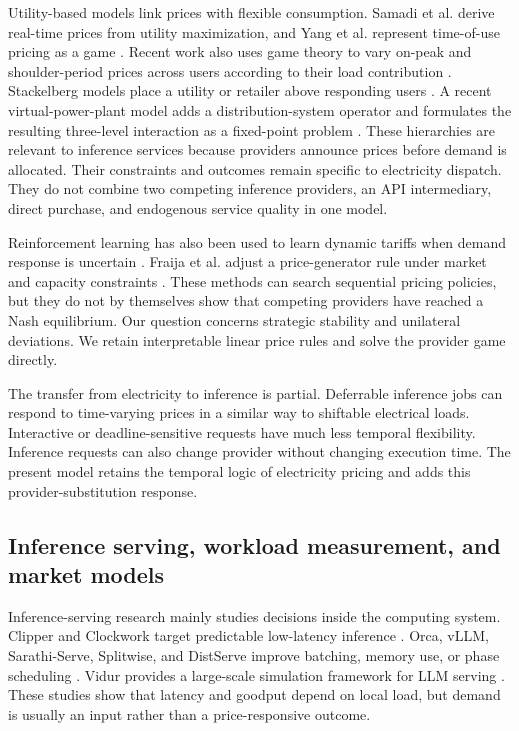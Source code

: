 \documentclass[11pt,a4paper]{article}
\begin{document}
Utility-based models link prices with flexible consumption. Samadi et al. derive real-time prices from utility maximization, and Yang et al. represent time-of-use pricing as a game \cite{samadi2010optimal,yang2013game}. Recent work also uses game theory to vary on-peak and shoulder-period prices across users according to their load contribution \cite{elafifi2024game}. Stackelberg models place a utility or retailer above responding users \cite{yu2016supply,srinivasan2017game}. A recent virtual-power-plant model adds a distribution-system operator and formulates the resulting three-level interaction as a fixed-point problem \cite{wang2026hierarchical}. These hierarchies are relevant to inference services because providers announce prices before demand is allocated. Their constraints and outcomes remain specific to electricity dispatch. They do not combine two competing inference providers, an API intermediary, direct purchase, and endogenous service quality in one model.

Reinforcement learning has also been used to learn dynamic tariffs when demand response is uncertain \cite{vazquez2019reinforcement,ismail2023dynamic}. Fraija et al. adjust a price-generator rule under market and capacity constraints \cite{fraija2024dynamic}. These methods can search sequential pricing policies, but they do not by themselves show that competing providers have reached a Nash equilibrium. Our question concerns strategic stability and unilateral deviations. We retain interpretable linear price rules and solve the provider game directly.

The transfer from electricity to inference is partial. Deferrable inference jobs can respond to time-varying prices in a similar way to shiftable electrical loads. Interactive or deadline-sensitive requests have much less temporal flexibility. Inference requests can also change provider without changing execution time. The present model retains the temporal logic of electricity pricing and adds this provider-substitution response.

\subsection{Inference serving, workload measurement, and market models}

Inference-serving research mainly studies decisions inside the computing system. Clipper and Clockwork target predictable low-latency inference \cite{crankshaw2017clipper,gujarati2020clockwork}. Orca, vLLM, Sarathi-Serve, Splitwise, and DistServe improve batching, memory use, or phase scheduling \cite{yu2022orca,kwon2023pagedattention,agrawal2024sarathiserve,patel2024splitwise,zhong2024distserve}. Vidur provides a large-scale simulation framework for LLM serving \cite{agrawal2024vidur}. These studies show that latency and goodput depend on local load, but demand is usually an input rather than a price-responsive outcome.
\end{document}
